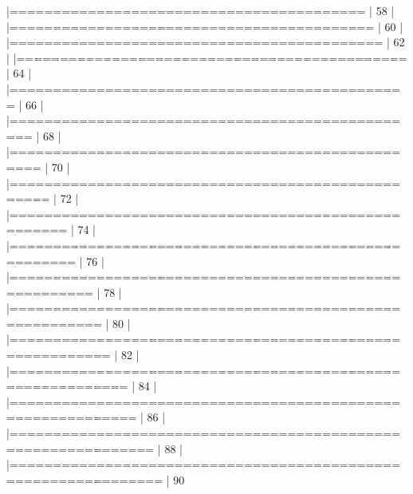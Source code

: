 \documentclass{article}
\begin{document}
\begin{Schunk}
\begin{Soutput}
  |=========================================                             |  58%
  |                                                                            
  |==========================================                            |  60%
  |                                                                            
  |===========================================                           |  62%
  |                                                                            
  |=============================================                         |  64%
  |                                                                            
  |==============================================                        |  66%
  |                                                                            
  |================================================                      |  68%
  |                                                                            
  |=================================================                     |  70%
  |                                                                            
  |==================================================                    |  72%
  |                                                                            
  |====================================================                  |  74%
  |                                                                            
  |=====================================================                 |  76%
  |                                                                            
  |=======================================================               |  78%
  |                                                                            
  |========================================================              |  80%
  |                                                                            
  |=========================================================             |  82%
  |                                                                            
  |===========================================================           |  84%
  |                                                                            
  |============================================================          |  86%
  |                                                                            
  |==============================================================        |  88%
  |                                                                            
  |===============================================================       |  90%

\end{Soutput}
\end{Schunk}
\end{document}
